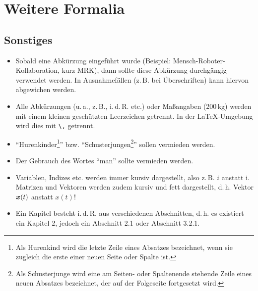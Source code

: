 
\chapter{Weitere Formalia}
\label{cap:Weitere Formalia}





\section{Sonstiges}

\begin{itemize}
	\item Sobald eine Abkürzung eingeführt wurde (Beispiel: Mensch-Roboter-Kollaboration, kurz MRK), dann sollte diese Abkürzung durchgängig verwendet werden. In Ausnahmefällen (z.\,B. bei Überschriften) kann hiervon abgewichen werden.
	\item Alle Abkürzungen (u.\,a., z.\,B., i.\,d.\,R. etc.) oder Maßangaben (200\,kg) werden mit einem kleinen geschützten Leerzeichen getrennt. In der LaTeX-Umgebung wird dies mit \verb+\,+ getrennt.
	\item "`Hurenkinder\footnote{Als Hurenkind wird die letzte Zeile eines Absatzes bezeichnet, wenn sie zugleich die erste einer neuen Seite oder Spalte ist.}"' bzw. "`Schusterjungen\footnote{Als Schusterjunge wird eine am Seiten- oder Spaltenende stehende Zeile eines neuen Absatzes bezeichnet, der auf der Folgeseite fortgesetzt wird.}"' sollen vermieden werden.
	\item Der Gebrauch des Wortes "`man"' sollte vermieden werden.
	\item Variablen, Indizes etc. werden immer kursiv dargestellt, also z.\,B. $i$ anstatt i. Matrizen und Vektoren werden zudem kursiv und fett dargestellt, d.\,h. Vektor $\boldsymbol{x}(t)$ anstatt $x(t)$!
	\item Ein Kapitel besteht i.\,d.\,R. aus verschiedenen Abschnitten, d.\,h. es existiert ein Kapitel 2, jedoch ein Abschnitt 2.1 oder Abschnitt 3.2.1.
\end{itemize}


